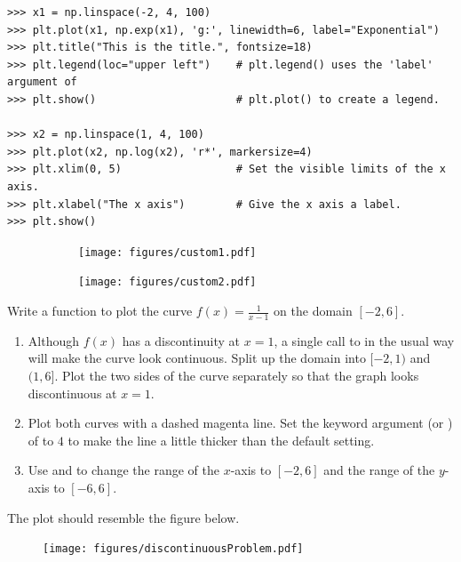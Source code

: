 \begin{lstlisting}
>>> x1 = np.linspace(-2, 4, 100)
>>> plt.plot(x1, np.exp(x1), 'g:', linewidth=6, label="Exponential")
>>> plt.title("This is the title.", fontsize=18)
>>> plt.legend(loc="upper left")    # plt.legend() uses the 'label' argument of
>>> plt.show()                      # plt.plot() to create a legend.

>>> x2 = np.linspace(1, 4, 100)
>>> plt.plot(x2, np.log(x2), 'r*', markersize=4)
>>> plt.xlim(0, 5)                  # Set the visible limits of the x axis.
>>> plt.xlabel("The x axis")        # Give the x axis a label.
>>> plt.show()
\end{lstlisting}
%
\begin{figure}[H] %
\captionsetup[subfigure]{justification=centering}
\centering
\begin{subfigure}{.49\textwidth}
    \centering
    \texttt{[image: figures/custom1.pdf]}
    \label{fig:custom1}
\end{subfigure}
%
\begin{subfigure}{.49\textwidth}
    \centering
    \texttt{[image: figures/custom2.pdf]}
    \label{fig:custom2}
\end{subfigure}
\label{fig:custom}
\end{figure}

\begin{problem} %
Write a function to plot the curve $f(x) = \frac{1}{x-1}$ on the domain $[-2,6]$.
\begin{enumerate}
\item
Although $f(x)$ has a discontinuity at $x=1$, a single call to  in the usual way will make the curve look continuous.
Split up the domain into $[-2,1)$ and $(1,6]$.
Plot the two sides of the curve separately so that the graph looks discontinuous at $x=1$.
\item Plot both curves with a dashed magenta line.
Set the keyword argument  (or ) of  to $4$ to make the line a little thicker than the default setting.
\item Use  and  to change the range of the $x$-axis to $[-2,6]$ and the range of the $y$-axis to $[-6, 6]$.
\end{enumerate}
The plot should resemble the figure below.

\begin{figure}[H] %
\texttt{[image: figures/discontinuousProblem.pdf]}
\end{figure}
\end{problem}

